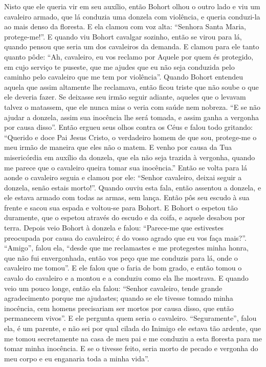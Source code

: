 Nisto que ele queria vir em seu auxílio, então Bohort olhou o outro lado e viu
um cavaleiro armado, que lá conduzia uma donzela com violência, e queria
conduzi-la ao mais denso da floresta. E ela clamou com voz alta: “Senhora Santa
Maria, protege-me!”. E quando viu Bohort cavalgar sozinho, então se virou para
lá, quando pensou que seria um dos cavaleiros da demanda. E clamou para ele
tanto quanto pôde: “Ah, cavaleiro, eu vos reclamo por Aquele por quem és
protegido, em cujo serviço te puseste, que me ajudes que eu não seja conduzida
pelo caminho pelo cavaleiro que me tem por violência”. Quando Bohort entendeu
aquela que assim altamente lhe reclamava, então ficou triste que não soube o
que ele deveria fazer. Se deixasse seu irmão seguir adiante, aqueles que o
levavam talvez o matassem, que ele nunca mias o veria com saúde nem nobreza. “E
se não ajudar a donzela, assim sua inocência lhe será tomada, e assim ganha a
vergonha por causa disso”. Então ergueu seus olhos contra os Céus e falou todo
gritando: “Querido e doce Pai Jesus Cristo, o verdadeiro homem de que sou,
protege-me o meu irmão de maneira que eles não o matem. E venho por causa da
Tua misericórdia em auxílio da donzela, que ela não seja trazida à vergonha,
quando me parece que o cavaleiro queira tomar sua inocência.” Então se volta
para lá aonde o cavaleiro seguia e clamou por ele: “Senhor cavaleiro, deixai
seguir a donzela, senão estais morto!”. Quando ouviu esta fala, então assentou
a donzela, e ele estava armado com todas as armas, sem lança. Então pôs seu
escudo à sua frente e sacou sua espada e voltou-se para Bohort. E Bohort o
espetou tão duramente, que o espetou através do escudo e da coifa, e aquele
desabou por terra. Depois veio Bohort à donzela e falou: “Parece-me que
estivestes preocupada por causa do cavaleiro; é do vosso agrado que eu vos faça
mais?”. “Amigo”, falou ela, “desde que me reclamastes e me protegestes minha
honra, que não fui envergonhada, então vos peço que me conduzis para lá, onde o
cavaleiro me tomou”. E ele falou que o faria de bom grado, e então tomou o
cavalo do cavaleiro e a montou e a conduziu como ela lhe mostrava. E quando
veio um pouco longe, então ela falou: “Senhor cavaleiro, tende grande
agradecimento porque me ajudastes; quando se ele tivesse tomado minha
inocência, cem homens precisariam ser mortos por causa disso, que então
permanecem vivos”. E ele pergunta quem seria o cavaleiro. “Seguramente”, falou
ela, é um parente, e não sei por qual cilada do Inimigo ele estava tão ardente,
que me tomou secretamente na casa de meu pai e me conduziu a esta floresta para
me tomar minha inocência. E se o tivesse feito, seria morto de pecado e
vergonha do meu corpo e eu enganaria toda a minha vida”. 

